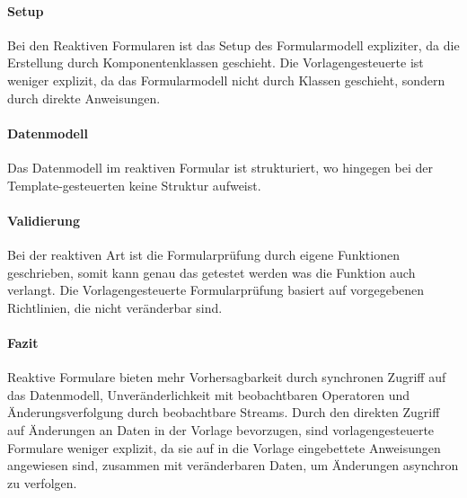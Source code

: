 \paragraph{Setup}
Bei den Reaktiven Formularen ist das Setup des Formularmodell expliziter, da die Erstellung durch Komponentenklassen geschieht. Die Vorlagengesteuerte ist weniger explizit, da das Formularmodell nicht durch Klassen geschieht, sondern durch direkte Anweisungen.

\paragraph{Datenmodell}
Das Datenmodell im reaktiven Formular ist strukturiert, wo hingegen bei der Template-gesteuerten keine Struktur aufweist.

\paragraph{Validierung}
Bei der reaktiven Art ist die Formularprüfung durch eigene Funktionen geschrieben, somit kann genau das getestet werden was die Funktion auch verlangt. Die Vorlagengesteuerte Formularprüfung basiert auf vorgegebenen Richtlinien, die nicht veränderbar sind.

\paragraph{Fazit}
Reaktive Formulare bieten mehr Vorhersagbarkeit durch synchronen Zugriff auf das Datenmodell, Unveränderlichkeit mit beobachtbaren Operatoren und Änderungsverfolgung durch beobachtbare Streams. Durch den direkten Zugriff auf Änderungen an Daten in der Vorlage bevorzugen, sind vorlagengesteuerte Formulare weniger explizit, da sie auf in die Vorlage eingebettete Anweisungen angewiesen sind, zusammen mit veränderbaren Daten, um Änderungen asynchron zu verfolgen.
